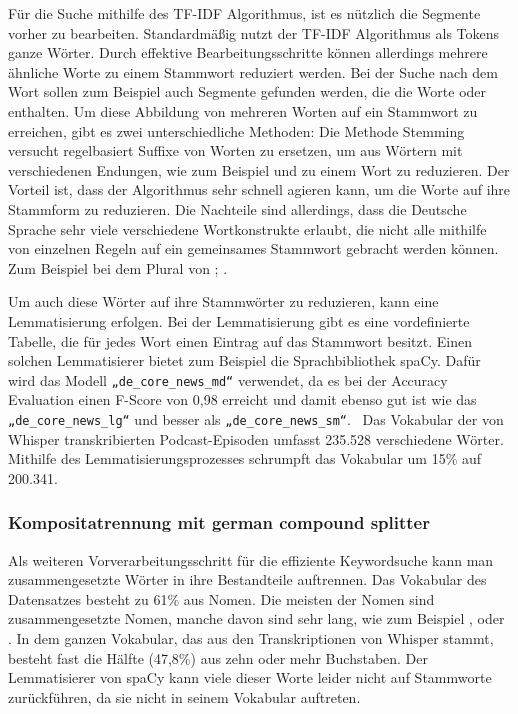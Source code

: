 Für die Suche mithilfe des TF-IDF Algorithmus, ist es nützlich die Segmente vorher zu bearbeiten.
Standardmäßig nutzt der TF-IDF Algorithmus als Tokens ganze Wörter.
Durch effektive Bearbeitungsschritte können allerdings mehrere ähnliche Worte zu einem Stammwort reduziert werden.
Bei der Suche nach dem Wort  sollen zum Beispiel auch Segmente gefunden werden, die die Worte  oder  enthalten.
Um diese Abbildung von mehreren Worten auf ein Stammwort zu erreichen, gibt es zwei unterschiedliche Methoden:
Die Methode Stemming versucht regelbasiert Suffixe von Worten zu ersetzen, um aus Wörtern mit verschiedenen Endungen, wie zum Beispiel  und  zu einem Wort  zu reduzieren.
Der Vorteil ist, dass der Algorithmus sehr schnell agieren kann, um die Worte auf ihre Stammform zu reduzieren.
Die Nachteile sind allerdings, dass die Deutsche Sprache sehr viele verschiedene Wortkonstrukte erlaubt, die nicht alle mithilfe von einzelnen Regeln auf ein gemeinsames Stammwort gebracht werden können. 
Zum Beispiel bei dem Plural von ; .

Um auch diese Wörter auf ihre Stammwörter zu reduzieren, kann eine Lemmatisierung erfolgen. 
Bei der Lemmatisierung gibt es eine vordefinierte Tabelle, die für jedes Wort einen Eintrag auf das Stammwort besitzt. 
Einen solchen Lemmatisierer bietet zum Beispiel die Sprachbibliothek spaCy. 
Dafür wird das Modell \verb|„de_core_news_md“| verwendet, da es bei der Accuracy Evaluation einen F-Score von 0,98 erreicht und damit ebenso gut ist wie das \verb|„de_core_news_lg“| und besser als \verb|„de_core_news_sm“|.~\cite{spacy2024}
Das Vokabular der von Whisper transkribierten Podcast-Episoden umfasst 235.528 verschiedene Wörter.
Mithilfe des Lemmatisierungsprozesses schrumpft das Vokabular um 15\% auf 200.341.


\subsubsection{Kompositatrennung mit german compound splitter}

Als weiteren Vorverarbeitungsschritt für die effiziente Keywordsuche kann man zusammengesetzte Wörter in ihre Bestandteile auftrennen.
Das Vokabular des Datensatzes besteht zu 61\% aus Nomen. 
Die meisten der Nomen sind zusammengesetzte Nomen, manche davon sind sehr lang, wie zum Beispiel , oder .
In dem ganzen Vokabular, das aus den Transkriptionen von Whisper stammt, besteht fast die Hälfte (47,8\%) aus zehn oder mehr Buchstaben.
Der Lemmatisierer von spaCy kann viele dieser Worte leider nicht auf Stammworte zurückführen, da sie nicht in seinem Vokabular auftreten.

